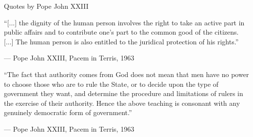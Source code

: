 
\begin{frame}[label=popeQuotes, noframenumbering]{Quotes by Pope John XXIII}
		\epigraph{ ``[...] the dignity of the human person involves the right to take an active part in public affairs and to contribute one's part to the common good of the citizens. [...] The human person is also entitled to the juridical protection of his rights.''}{--- \textup{Pope John XXIII}, Pacem in Terris, 1963}
		\vspace{.25cm}
		\epigraph{ ``The fact that authority comes from God does not mean that men have no power to choose those who are to rule the State, or to decide upon the type of government they want, and determine the procedure and limitations of rulers in the exercise of their authority. Hence the above teaching is consonant with any genuinely democratic form of government.''}{--- \textup{Pope John XXIII}, Pacem in Terris, 1963}
		\vspace{.25cm}
	\hyperlink{home2<1>}{}
\end{frame}
